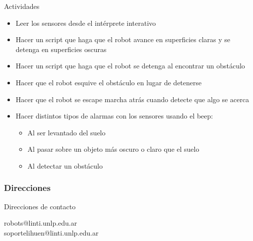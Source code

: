 \documentclass{beamer}[10]
\begin{document}
\begin{frame}{Actividades}
	\begin{itemize}[<+->]
		\item Leer los sensores desde el intérprete interativo
		\item Hacer un script que haga que el robot avance en superficies claras y se detenga en superficies oscuras
		\item Hacer un script que haga que el robot se detenga al encontrar un obstáculo
		\item Hacer que el robot esquive el obstáculo en lugar de detenerse
		\item Hacer que el robot se escape marcha atrás cuando detecte que algo se acerca
		\item Hacer distintos tipos de alarmas con los sensores usando el beep:
		\begin{itemize}
			\item Al ser levantado del suelo
			\item Al pasar sobre un objeto más oscuro o claro que el suelo
			\item Al detectar un obstáculo
		\end{itemize}
	\end{itemize}
\end{frame}
\frame
{
\frametitle{Direcciones}

\begin{block}{Direcciones de contacto}
\begin{center}
robots@linti.unlp.edu.ar \\
soportelihuen@linti.unlp.edu.ar
\end{center}
\end{block}

}
\end{document}
